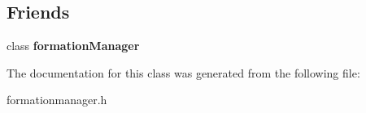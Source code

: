 \subsection*{Friends}
\begin{DoxyCompactItemize}
\item 
\hypertarget{classformation_a2c2226dacc6a09e4f390cda4bdc76eba}{class {\bfseries formation\+Manager}}\label{classformation_a2c2226dacc6a09e4f390cda4bdc76eba}

\end{DoxyCompactItemize}


The documentation for this class was generated from the following file\+:\begin{DoxyCompactItemize}
\item 
formationmanager.\+h\end{DoxyCompactItemize}
